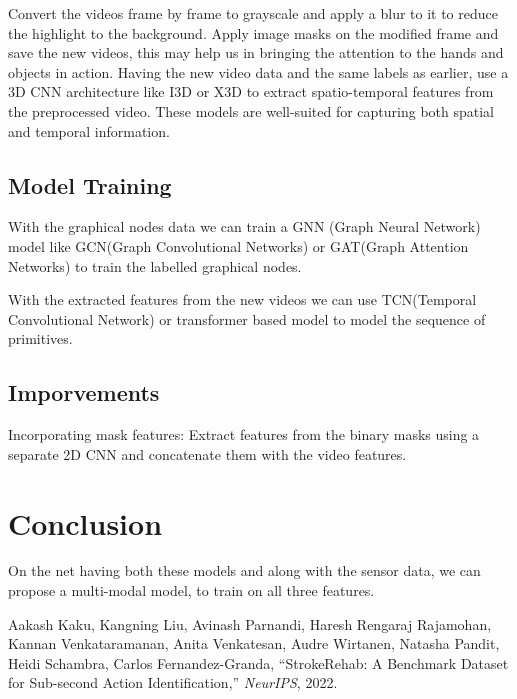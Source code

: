 \documentclass[conference]{IEEEtran}
\begin{document}
Convert the videos frame by frame to grayscale and apply a blur to it to reduce the highlight to the background. Apply image masks on the modified frame and save the new videos, this may help us in bringing the attention to the hands and objects in action.
Having the new video data and the same labels as earlier, use a 3D CNN architecture like I3D or X3D to extract spatio-temporal features from the preprocessed video. These models are well-suited for capturing both spatial and temporal information. 
\subsection{Model Training}
With the graphical nodes data we can train a GNN (Graph Neural Network) model like GCN(Graph Convolutional Networks) or GAT(Graph Attention Networks) to train the labelled graphical nodes. 

With the extracted features from the new videos we can use TCN(Temporal Convolutional Network) or transformer based model to model the sequence of primitives.

\subsection{Imporvements}
Incorporating mask features: Extract features from the binary masks using a separate 2D CNN and concatenate them with the video features.

\section{Conclusion}
On the net having both these models and along with the sensor data, we can propose a multi-modal model, to train on all three features. 

\begin{thebibliography}{1}
    Aakash Kaku, Kangning Liu, Avinash Parnandi, Haresh Rengaraj Rajamohan, Kannan Venkataramanan, Anita Venkatesan, Audre Wirtanen, Natasha Pandit, Heidi Schambra, Carlos Fernandez-Granda, ``StrokeRehab: A Benchmark Dataset for Sub-second Action Identification,'' \emph{NeurIPS}, 2022.
\end{thebibliography}
\end{document}
